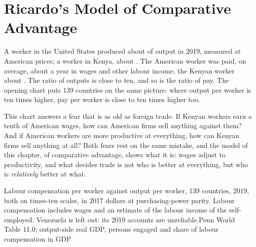 \chapter{Ricardo's Model of Comparative Advantage}\label{ch:g10:ricardo-model}

A worker in the United States produced about  of output in 2019, measured at American
prices; a worker in Kenya, about . The American worker was paid, on average, about
 a year in wages and other labour income, the Kenyan worker about . The ratio of
outputs is close to ten, and so is the ratio of pay. The opening chart puts 139 countries on the same
picture: where output per worker is ten times higher, pay per worker is close to ten times higher too.

This chart answers a fear that is as old as foreign trade. If Kenyan workers earn a tenth of American
wages, how can American firms sell anything against them? And if American workers are more productive
at everything, how can Kenyan firms sell anything at all? Both fears rest on the same mistake, and the
model of this chapter,  of comparative advantage, shows what it is: wages adjust to
productivity, and what decides trade is not who is better at everything, but who is \emph{relatively}
better at what.

\begin{openingchart}{Labour compensation per worker against output per worker, 139 countries, 2019,
both on times-ten scales, in 2017 dollars at purchasing-power parity. Labour compensation includes wages
and an estimate of the labour income of the self-employed. Venezuela is left out: its 2019 accounts are
unreliable.}{Penn World Table 11.0; output-side real GDP,
persons engaged and share of labour compensation in GDP}
\end{openingchart}

